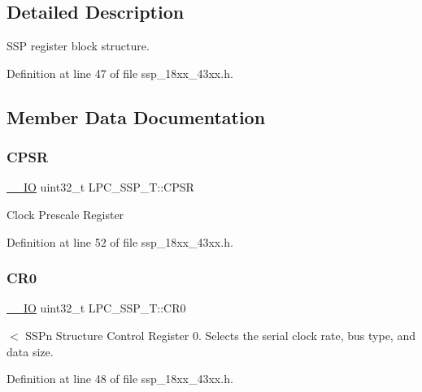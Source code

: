 \subsection{Detailed Description}
S\+SP register block structure. 

Definition at line 47 of file ssp\+\_\+18xx\+\_\+43xx.\+h.



\subsection{Member Data Documentation}
\mbox{\label{struct_l_p_c___s_s_p___t_a48e7161fc6e6b91bd724a17df5435141}} 
\subsubsection{\texorpdfstring{C\+P\+SR}{CPSR}}
{\footnotesize\ttfamily \hyperlink{core__sc300_8h_aec43007d9998a0a0e01faede4133d6be}{\+\_\+\+\_\+\+IO} uint32\+\_\+t L\+P\+C\+\_\+\+S\+S\+P\+\_\+\+T\+::\+C\+P\+SR}

Clock Prescale Register 

Definition at line 52 of file ssp\+\_\+18xx\+\_\+43xx.\+h.

\mbox{\label{struct_l_p_c___s_s_p___t_af8ad155254cb659608f4c1c6bd83b62b}} 
\subsubsection{\texorpdfstring{C\+R0}{CR0}}
{\footnotesize\ttfamily \hyperlink{core__sc300_8h_aec43007d9998a0a0e01faede4133d6be}{\+\_\+\+\_\+\+IO} uint32\+\_\+t L\+P\+C\+\_\+\+S\+S\+P\+\_\+\+T\+::\+C\+R0}

$<$ S\+S\+Pn Structure Control Register 0. Selects the serial clock rate, bus type, and data size. 

Definition at line 48 of file ssp\+\_\+18xx\+\_\+43xx.\+h.

\mbox{\label{struct_l_p_c___s_s_p___t_a648b740833659e86e8be3a8f6c17147c}} 
